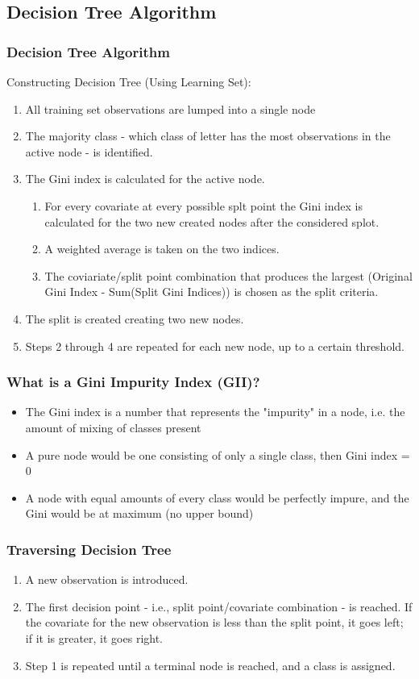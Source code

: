 \documentclass{beamer}
\begin{document}
\subsection{Decision Tree Algorithm}
\begin{frame}
\frametitle{Decision Tree Algorithm}
Constructing Decision Tree (Using Learning Set):
\begin{enumerate}
\item \small{All training set observations are lumped into a single node}
\item \small{The majority class - which class of letter has the most observations in the active node - is identified.}
\item \small{The Gini index is calculated for the active node.}
\begin{enumerate}
\item \small{For every covariate at every possible splt point the Gini index is calculated for the two new created nodes after the considered splot.}
\item \small{A weighted average is taken on the two indices.}
\item \small{The coviariate/split point combination that produces the largest (Original Gini Index - Sum(Split Gini Indices)) is chosen as the split criteria.}
\end{enumerate}
\item \small{The split is created creating two new nodes.}
\item \small{Steps 2 through 4 are repeated for each new node, up to a certain threshold.}
\end{enumerate}
\end{frame}

\begin{frame}
\frametitle{What is a Gini Impurity Index (GII)?}
\begin{itemize}
\item The Gini index is a number that represents the "impurity" in a node, i.e. the amount of mixing of classes present
\item A pure node would be one consisting of only a single class, then Gini index = 0
\item A node with equal amounts of every class would be perfectly impure, and the Gini would be at maximum (no upper bound)
\end{itemize}
\end{frame}

\begin{frame}
\frametitle{Traversing Decision Tree}
\begin{enumerate}
\item A new observation is introduced.
\item The first decision point - i.e., split point/covariate combination - is reached. If the covariate for the new observation is less than the split point, it goes left; if it is greater, it goes right.
\item Step 1 is repeated until a terminal node is reached, and a class is assigned.
\end{enumerate}
\end{frame}
\end{document}
